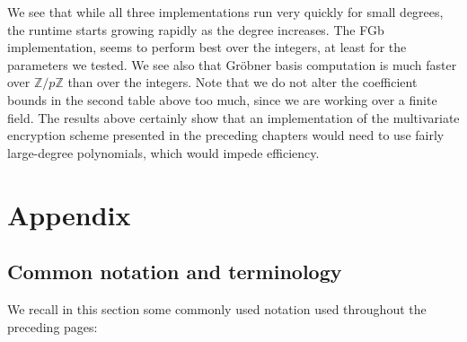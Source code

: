 \documentclass[11pt]{report}
\newcommand{\Z}{\mathbb{Z}}
\begin{document}
We see that while all three implementations run very quickly for small degrees, the runtime starts growing rapidly as the degree increases. The FGb implementation, seems to perform best over the integers, at least for the parameters we tested. We see also that Gr\"obner basis computation is much faster over $\Z/p\Z$ than over the integers. Note that we do not alter the coefficient bounds in the second table above too much, since we are working over a finite field. The results above certainly show that an implementation of the multivariate encryption scheme presented in the preceding chapters would need to use fairly large-degree polynomials, which would impede efficiency.

\chapter{Appendix}

\section{Common notation and terminology}

We recall in this section some commonly used notation used throughout the preceding pages:
\end{document}
